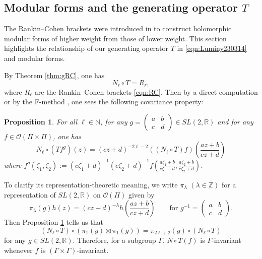 \documentclass[12pt,leqno]{amsart}
\theoremstyle{plain}
\newtheorem{proposition}[thm]{Proposition}
\theoremstyle{definition}
\begin{document}
\subsection{Modular forms and the generating operator $T$}

The Rankin--Cohen brackets were introduced in \cite{xCo75, xRa56}
 to construct holomorphic modular forms
 of higher weight from those of lower weight.  
This section highlights the relationship
 of our generating operator $T$ in \eqref{eqn:Luminy230314}
 and modular forms.  



By Theorem \ref{thm:gRC}, 
 one has
\begin{equation}
\label{eqn:NTRl}
   N_{\ell} \circ T = R_{\ell},
\end{equation}
where $R_{\ell}$ are the Rankin--Cohen brackets \eqref{eqn:RC}.  
Then by a direct computation \cite{xCo75}
or by the F-method \cite{KP16}, 
 one sees the following covariance property:


\begin{proposition}
\label{prop:TSL}
For all $\ell \in {\mathbb{N}}$, 
 for any $g = \begin{pmatrix} a & b \\ c & d\end{pmatrix} \in SL(2,{\mathbb{R}})$
 and for any $f \in {\mathcal{O}}(\Pi \times \Pi)$, 
 one has
\[
N_{\ell} \circ (T f^g)(z)=(c z + d)^{-2\ell -2}((N_{\ell} \circ T) f)(\frac{a z +b}{c z +d})
\]
where 
$f^g(\zeta_1, \zeta_2):=(c\zeta_1+d)^{-1}(c\zeta_2+d)^{-1}f(\frac{a \zeta_1 + b}{c \zeta_1+d}, \frac{a \zeta_2 + b}{c \zeta_2+d})$.  
\end{proposition}



To clarify its representation-theoretic meaning, 
 we write $\pi_{\lambda}$ $(\lambda \in {\mathbb{Z}})$
 for a representation of $SL(2,{\mathbb{R}})$
 on ${\mathcal{O}}(\Pi)$
 given by 
\begin{equation}
\label{eqn:pilmd}
  \pi_{\lambda}(g)h(z)
  =
  (c z + d)^{-\lambda}
  h(\frac {a z+b}{c z+d})
\qquad
 \text{for $g^{-1}=\begin{pmatrix} a & b \\ c & d\end{pmatrix}$}.  
\end{equation}
Then Proposition \ref{prop:TSL} tells us
 that 
\begin{equation}
\label{eqn:modularity}
 (N_{\ell} \circ T)\circ(\pi_1(g) \boxtimes \pi_1(g))
 =
 \pi_{2\ell+2}(g) \circ (N_{\ell}\circ T)
\end{equation}
for any $g \in SL(2,{\mathbb{R}})$.  
Therefore, 
 for a subgroup $\Gamma$, 
 $N \circ T(f)$ is $\Gamma$-invariant
 whenever $f$ is $(\Gamma \times \Gamma)$-invariant.  
\end{document}
